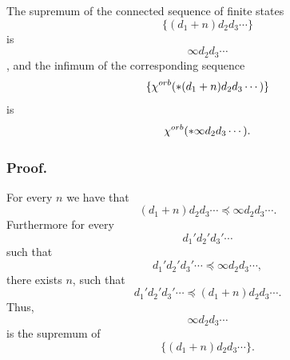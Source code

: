 \begin{lemma}\label{chi supp functoriality}
The supremum of the connected sequence 
of finite states 
\begin{equation}
\{(d_1+n)d_2d_3\cdots\}
\end{equation}
is
\begin{equation}
\infty d_2d_3\cdots
\end{equation}, and 
the infimum of the corresponding sequence 
\begin{equation}
\{{\chi^{orb}(*(d_1+n)d_2d_3\cdots)}\}\end{equation} 
is  
\begin{equation}
{\chi^{orb}(*\infty d_2d_3\cdots)}.
\end{equation}
\end{lemma}
\subsubsection{Proof.} \label{chi supp functoriality proof}

For every $n$ we have that 
\begin{equation}
(d_1+n)d_2d_3\cdots\preceq\infty d_2d_3\cdots.
\end{equation} 
Furthermore for 
every 
\begin{equation}
d_1'd_2'd_3'\cdots\end{equation} such that 
\begin{equation}
d_1'd_2'd_3'\cdots\preceq \infty d_2d_3\cdots,
\end{equation} there 
exists $n$, such that 
\begin{equation}
d_1'd_2'd_3' \cdots\preceq(d_1+n)d_2d_3\cdots.
\end{equation} 
Thus, 
\begin{equation}
\infty d_2d_3\cdots
\end{equation} 
is the supremum of 
\begin{equation}
\{(d_1+n)d_2d_3\cdots\}.
\end{equation}

